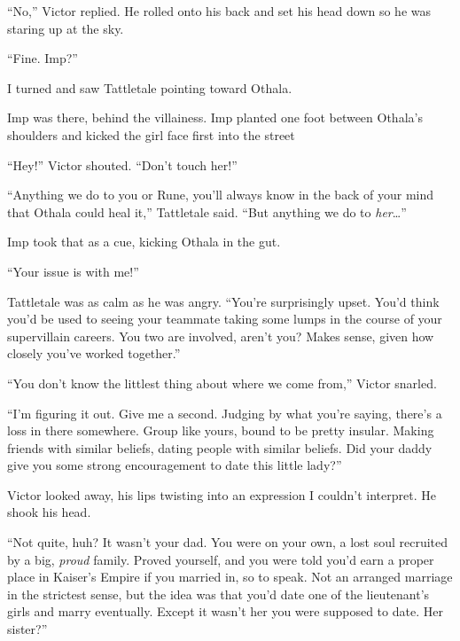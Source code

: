 ``No,'' Victor replied.  He rolled onto his back and set his head down so he was staring up at the sky.



``Fine.  Imp?''



I turned and saw Tattletale pointing toward Othala.



Imp was there, behind the villainess.  Imp planted one foot between Othala's shoulders and kicked the girl face first into the street



``Hey!''  Victor shouted.  ``Don't touch her!''



``Anything we do to you or Rune, you'll always know in the back of your mind that Othala  could heal it,'' Tattletale said.  ``But anything we do to \emph{her}\ldots''



Imp took that as a cue, kicking Othala in the gut.



``Your issue is with me!''



Tattletale was as calm as he was angry.  ``You're surprisingly upset.  You'd think you'd be used to seeing your teammate taking some lumps in the course of your supervillain careers.  You two are involved, aren't you?  Makes sense, given how closely you've worked together.''



``You don't know the littlest thing about where we come from,'' Victor snarled.



``I'm figuring it out.  Give me a second.  Judging by what you're saying, there's a loss in there somewhere.  Group like yours, bound to be pretty insular.  Making friends with similar beliefs, dating people with similar beliefs.  Did your daddy give you some strong encouragement to date this little lady?''



Victor looked away, his lips twisting into an expression I couldn't interpret.  He shook his head.



``Not quite, huh?  It wasn't your dad.  You were on your own, a lost soul recruited by a big, \emph{proud }family.  Proved yourself, and you were told you'd earn a proper place in Kaiser's Empire if you married in, so to speak.  Not an arranged marriage in the strictest sense, but the idea was that you'd date one of the lieutenant's girls and marry eventually.  Except it wasn't her you were supposed to date.  Her sister?''



